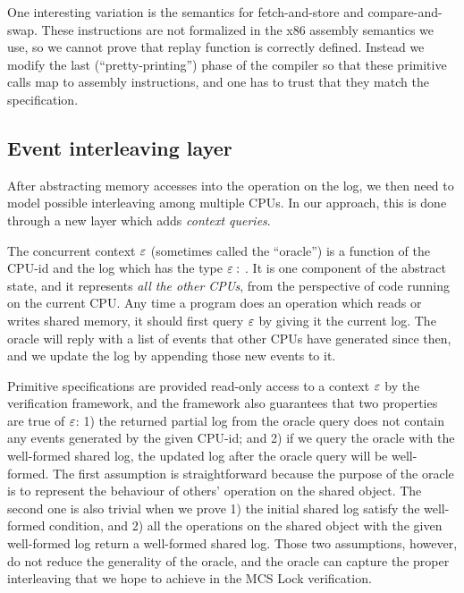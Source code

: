 One interesting variation is the semantics
for fetch-and-store and compare-and-swap. These instructions are not
formalized in the x86 assembly semantics we use, so we cannot prove
that replay function is correctly defined. Instead we modify the last
(``pretty-printing'') phase of the compiler so that these primitive calls map to assembly
instructions, and one has to trust that they match the specification.

\subsection{Event interleaving layer}
\label{chapter:mcslock:subsec:abstractoperationlayer}

After abstracting memory accesses into the operation on the log, we
then need to model possible interleaving among multiple CPUs. In
our approach, this is done through a new layer which adds \emph{context queries}.

The concurrent context ${\varepsilon}$ (sometimes called the ``oracle'') is
a function of the CPU-id and the log which has the type
${\varepsilon}:$ .
It is one component of the abstract state, and it represents \emph{all
the other CPUs}, from the perspective of code running on the current
CPU.  Any time a program does an operation which reads or writes
shared memory, it should first query ${\varepsilon}$ by giving it the
current log. The oracle will reply with a list of events that other
CPUs have generated since then, and we update the log by appending
those new events to it.

Primitive specifications are provided read-only access to a context
${\varepsilon}$ by the verification framework, and the framework also
guarantees that two properties are true of ${\varepsilon}$: 1) the returned
partial log from the oracle query does not contain any events
generated by the given CPU-id; and 2) if we query the oracle with the
well-formed shared log, the updated log after the oracle query will
be well-formed.
The first assumption is straightforward because the purpose of the oracle is to represent the behaviour of others' operation on the shared object.
The second one is also trivial when we prove 1) the initial shared log satisfy the well-formed condition, and 2) all the operations on the shared object with the given well-formed log return a well-formed shared log.
Those two assumptions, however, do not reduce the generality of the oracle, and the oracle can capture the proper interleaving that we hope to achieve in the MCS Lock verification.

